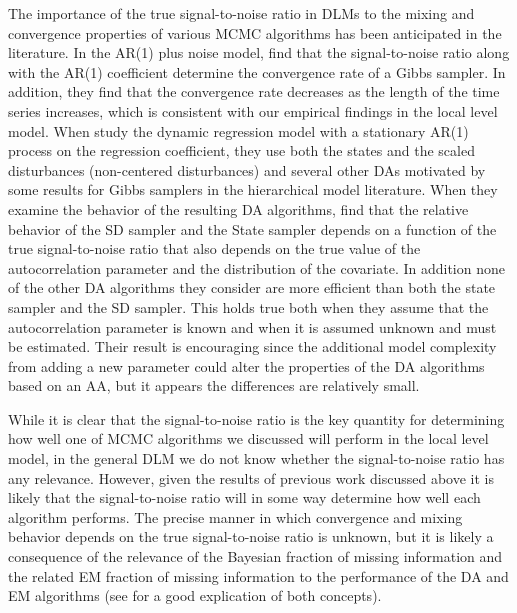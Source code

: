 \documentclass[12pt]{article}
\begin{document}
The importance of the true signal-to-noise ratio in DLMs to the mixing and convergence properties of various MCMC algorithms has been anticipated in the literature. In the AR(1) plus noise model, \citet{pitt1999analytic} find that the signal-to-noise ratio along with the AR(1) coefficient determine the convergence rate of a Gibbs sampler. In addition, they find that the convergence rate decreases as the length of the time series increases, which is consistent with our empirical findings in the local level model. When \citet{fruhwirth2004efficient} study the dynamic regression model with a stationary AR(1) process on the regression coefficient, they use both the states and the scaled disturbances (non-centered disturbances) and several other DAs motivated by some results for Gibbs samplers in the hierarchical model literature. When they examine the behavior of the resulting DA algorithms, \citet{fruhwirth2004efficient} find that the relative behavior of the SD sampler and the State sampler depends on a function of the true signal-to-noise ratio that also depends on the true value of the autocorrelation parameter and the distribution of the covariate. In addition none of the other DA algorithms they consider are more efficient than both the state sampler and the SD sampler. This holds true both when they assume that the autocorrelation parameter is known and when it is assumed unknown and must be estimated. Their result is encouraging since the additional model complexity from adding a new parameter could alter the properties of the DA algorithms based on an AA, but it appears the differences are relatively small.

While it is clear that the signal-to-noise ratio is the key quantity for determining how well one of MCMC algorithms we discussed will perform in the local level model, in the general DLM we do not know whether the signal-to-noise ratio has any relevance. However, given the results of previous work discussed above it is likely that the signal-to-noise ratio will in some way determine how well each algorithm performs. The precise manner in which convergence and mixing behavior depends on the true signal-to-noise ratio is unknown, but it is likely a consequence of the relevance of the Bayesian fraction of missing information and the related EM fraction of missing information to the performance of the DA and EM algorithms (see \citet{van2001art} for a good explication of both concepts).

\end{document}
